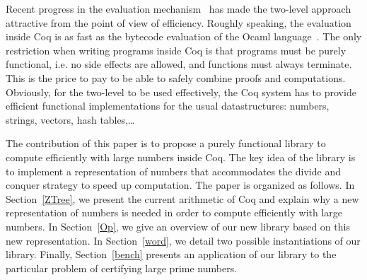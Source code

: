 Recent progress in the evaluation mechanism~\cite{GreLer} has made the two-level
approach attractive from the point of view of efficiency. Roughly speaking,
the evaluation inside Coq is as fast as the bytecode evaluation of
the {\sc Ocaml} language~\cite{Ocaml}. The only restriction when writing programs
inside {\sc Coq} is that programs must be purely functional, i.e. no side effects are allowed,
and functions must always terminate. This is the price to pay to be able to safely combine proofs
and computations. Obviously, for the two-level to be used effectively, 
the {\sc Coq} system has to provide efficient functional implementations for the
usual datastructures: numbers, strings, vectors, hash tables,\dots 

The contribution of this paper is to propose a purely functional library to compute 
efficiently with large numbers inside {\sc Coq}. The key idea of the library is to 
implement a representation of numbers that accommodates the divide and conquer strategy 
to speed up computation. The paper is organized as follows. In Section~\ref{ZTree}, we present 
the current arithmetic of {\sc Coq} and explain why a new representation of numbers is needed
in order to compute efficiently with large numbers. In Section~\ref{Op}, we give an overview of our new library
based on this new representation.  
In Section~\ref{word}, we detail two possible instantiations of our library.
Finally, Section~\ref{bench} presents an application of our library to the particular
problem of certifying large prime numbers.
